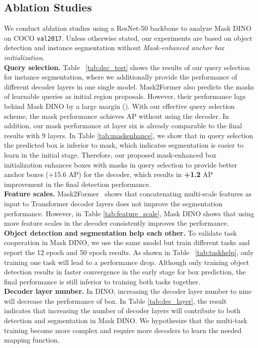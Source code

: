 \documentclass[10pt,twocolumn,letterpaper]{article}
\begin{document}
\subsection{Ablation Studies}
We conduct ablation studies using a ResNet-50 backbone to analyze Mask DINO on COCO \texttt{val2017}. Unless otherwise stated, our experiments are based on object detection and instance segmentation without \emph{Mask-enhanced anchor box initialization}.
\\\textbf{Query selection.} Table ~\ref{tab:dec_test} shows the results of our query selection for instance segmentation, where we additionally provide the performance of different decoder layers in one single model. Mask2Former also predicts the masks of learnable queries as initial region proposals. However, their performance lags behind Mask DINO by a large margin (). With our effective query selection scheme, the mask performance achieves  AP without using the decoder. In addition, our mask performance at layer six is already comparable to the final results with 9 layers. In Table \ref{tab:maskenhance}, we show that in query selection the predicted box is inferior to mask, which indicates segmentation is easier to learn in the initial stage. Therefore, our proposed mask-enhanced box initialization enhances boxes with masks in query selection to provide better anchor boxes (+15.6 AP) for the decoder, which results in \textbf{+1.2} AP improvement in the final detection performance. 
\\\textbf{Feature scales.}
Mask2Former~\cite{cheng2021mask2former} shows that concatenating multi-scale features as input to Transformer decoder layers does not improve the segmentation performance. However, in Table \ref{tab:feature_scale}, Mask DINO shows that using more feature scales in the decoder consistently improves the performance.
\\\textbf{Object detection and segmentation help each other.} To validate task cooperation in Mask DINO, we use the same model but train different tasks and report the 12 epoch and 50 epoch results. As shown in Table ~\ref{tab:taskhelp}, only training one task will lead to a performance drop. Although only training object detection results in faster convergence in the early stage for box prediction, the final  performance is still inferior to training both tasks together.
\\\textbf{Decoder layer number.}
In DINO, increasing the decoder layer number to nine will decrease the performance of box. In Table \ref{tab:dec_layer}, the result indicates that increasing the number of decoder layers will contribute to both detection and segmentation in Mask DINO. We hypothesize that the multi-task training become more complex and require more decoders to learn the needed mapping function.
\end{document}
